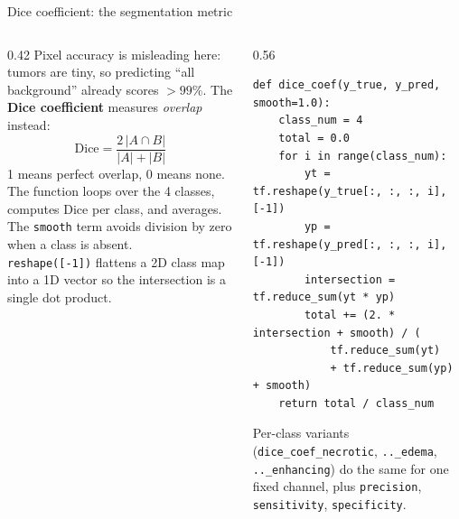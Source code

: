 \documentclass[10pt,aspectratio=169]{beamer}
\renewcommand{\section}[2][]{}
\begin{document}
\begin{frame}[fragile]{Dice coefficient: the segmentation metric}
\begin{columns}[T,onlytextwidth]
\begin{column}{0.42\textwidth}
\small
Pixel accuracy is misleading here: tumors are tiny, so predicting ``all background'' already scores
$>99\%$. The \textbf{Dice coefficient} measures \emph{overlap} instead:
\[
  \text{Dice} = \frac{2\,|A \cap B|}{|A| + |B|}
\]
1 means perfect overlap, 0 means none.\\[0.4em]
The function loops over the 4 classes, computes Dice per class, and averages. The \texttt{smooth}
term avoids division by zero when a class is absent.\\[0.4em]
\texttt{reshape([-1])} flattens a 2D class map into a 1D vector so the intersection is a single dot
product.
\end{column}
\begin{column}{0.56\textwidth}
\begin{lstlisting}[firstnumber=last]
def dice_coef(y_true, y_pred, smooth=1.0):
    class_num = 4
    total = 0.0
    for i in range(class_num):
        yt = tf.reshape(y_true[:, :, :, i], [-1])
        yp = tf.reshape(y_pred[:, :, :, i], [-1])
        intersection = tf.reduce_sum(yt * yp)
        total += (2. * intersection + smooth) / (
            tf.reduce_sum(yt)
            + tf.reduce_sum(yp) + smooth)
    return total / class_num
\end{lstlisting}
\vspace{0.3em}
\scriptsize Per-class variants (\texttt{dice\_coef\_necrotic}, \texttt{..\_edema},
\texttt{..\_enhancing}) do the same for one fixed channel, plus \texttt{precision},
\texttt{sensitivity}, \texttt{specificity}.
\end{column}
\end{columns}
\end{frame}

\section{The U-Net model}
\end{document}
